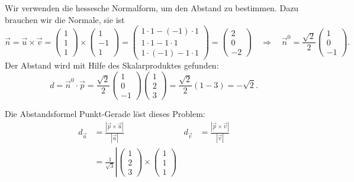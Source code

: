 \begin{loesung}
\begin{teilaufgaben}
\item Wir verwenden die hessesche Normalform, um den Abstand zu bestimmen.
Dazu brauchen wir die Normale, sie ist
\[
\vec n=\vec u\times \vec v=
\begin{pmatrix}1\\1\\1\end{pmatrix}
\times
\begin{pmatrix}1\\-1\\1\end{pmatrix}
=
\begin{pmatrix}
1\cdot 1-(-1)\cdot 1\\
1\cdot 1-1\cdot 1\\
1\cdot (-1)-1\cdot 1
\end{pmatrix}
=
\begin{pmatrix}
2\\0\\-2
\end{pmatrix}
\quad\Rightarrow\quad
\vec{n}^0
=
\frac{\sqrt{2}}2
\begin{pmatrix}1\\0\\-1\end{pmatrix}.
\]
Der Abstand wird mit Hilfe des Skalarproduktes gefunden:
\[
d
=
\vec{n}^0\cdot \vec{p}
=
\frac{\sqrt{2}}2
\begin{pmatrix}1\\0\\-1\end{pmatrix}
\begin{pmatrix}1\\2\\3\end{pmatrix}
=
\frac{\sqrt{2}}2(1-3)=-\sqrt{2}.
\]
\item
Die Abstandsformel Punkt-Gerade löst dieses Problem:
\begin{align*}
d_{\vec{u}}
&=
\frac{|\vec{p}\times \vec{u}|}{|\vec{u}|}
&
d_{\vec{v}}
&=
\frac{|\vec{p}\times \vec{v}|}{|\vec{v}|}
\\
&=
\frac{1}{\sqrt{3}}
\left|
\begin{pmatrix}1\\2\\3\end{pmatrix}
\times
\begin{pmatrix}1\\1\\1\end{pmatrix}

\end{align*}
\end{teilaufgaben}
\end{loesung}
